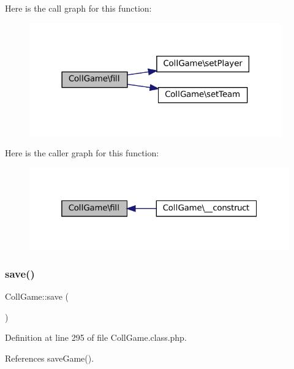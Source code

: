 Here is the call graph for this function\+:\nopagebreak
\begin{figure}[H]
\begin{center}
\leavevmode
\includegraphics[width=309pt]{class_coll_game_aa5284af9c5db56f146e3c07fc0b71a8f_cgraph}
\end{center}
\end{figure}
Here is the caller graph for this function\+:\nopagebreak
\begin{figure}[H]
\begin{center}
\leavevmode
\includegraphics[width=319pt]{class_coll_game_aa5284af9c5db56f146e3c07fc0b71a8f_icgraph}
\end{center}
\end{figure}
\mbox{\label{class_coll_game_a5a48c2bf061280bf901567acf9e6b131}} 
\subsubsection{\texorpdfstring{save()}{save()}}
{\footnotesize\ttfamily Coll\+Game\+::save (\begin{DoxyParamCaption}{ }\end{DoxyParamCaption})}



Definition at line 295 of file Coll\+Game.\+class.\+php.



References save\+Game().


